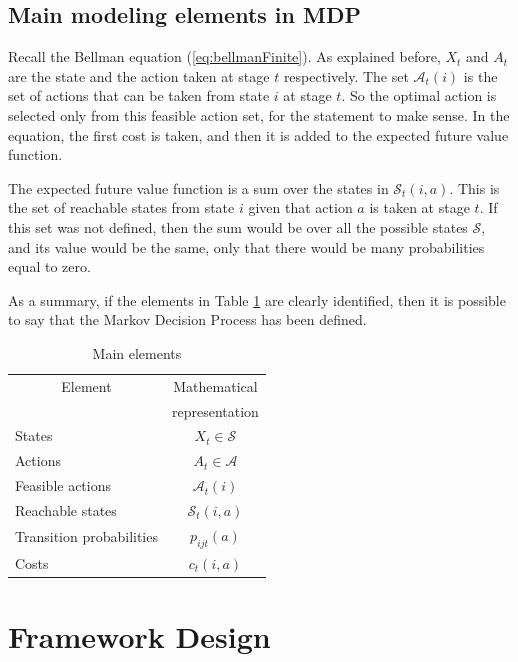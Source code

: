 \documentclass[11pt]{article}
\begin{document}
\subsection{Main modeling elements in MDP}

Recall the Bellman equation (\ref{eq:bellmanFinite}). As explained before, $X_t$ and $A_t$ are the state and the action taken at stage $t$ respectively. The set $\mathcal{A}_t(i)$ is the set of actions that can be taken from state $i$ at stage $t$. So the optimal action is selected only from this feasible action set, for the statement to make sense. In the equation, the first cost is taken, and then it is added to the expected future value function.

The expected future value function is a sum over the states in $\mathcal{S}_t(i,a)$. This is the set of reachable states from state $i$ given that action $a$ is taken at stage $t$. If this set was not defined, then the sum would be over all the possible states $\mathcal{S}$, and its value would be the same, only that there would be many probabilities equal to zero.

As a summary, if the elements in Table \ref{tb:elems} are clearly identified, then it is possible to say that the Markov Decision Process has been defined.

\begin{table}[ht]
  \centering
  \begin{tabular}{|l|c|}
    \hline
    \multicolumn{1}{|c|}{Element} &  \multicolumn{1}{|c|}{Mathematical} \\
    \multicolumn{1}{|c|}{} &  \multicolumn{1}{|c|}{representation} \\
    \hline
    \hline
      States & $X_t \in \mathcal{S}$ \\
      \hline
      Actions & $A_t \in \mathcal{A}$ \\
      \hline
      Feasible actions & $\mathcal{A}_t(i)$ \\
      \hline
      Reachable states & $\mathcal{S}_t(i,a)$ \\
      \hline
      Transition probabilities & $p_{ijt}(a)$ \\
      \hline
      Costs & $c_t(i,a)$ \\
      \hline
  \end{tabular}\caption{Main elements}\label{tb:elems}
\end{table}


\section{Framework Design}
\end{document}

